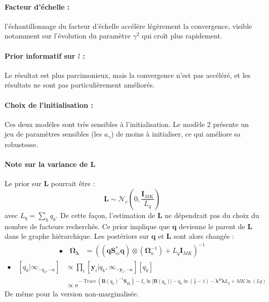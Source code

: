 \documentclass[ 12pt]{article}
\newcommand{\e}{\mathrm{e}}
\newcommand{\tr}[1]{\operatorname{Trace}\!\left(#1\right)}
\begin{document}
\paragraph{Facteur d'échelle : } l'échantillonnage du facteur d'échelle accélère légèrement la convergence, visible notamment sur l'évolution du paramètre $\gamma^2$ qui croît plus rapidement.

\paragraph{Prior informatif sur $l$ :} Le résultat est plus parcimonieux, mais la convergence n'est pas accéléré, et les résultats ne sont pas particulièrement améliorés.

\paragraph{Choix de l'initialisation : } Ces deux modèles sont très sensibles à l'initialisation.  Le modèle 2 présente un jeu de paramètres sensibles (les $a_\gamma$) de moins à initialiser, ce qui améliore sa robustesse.

\paragraph{Note sur la variance de $\bm{L}$}
Le prior sur $\bm{L}$ pourrait être : 
\begin{equation*}
	    \bm{L} \sim \mathcal{N}_c (0,\frac{\bm{I}_{MK}}{L_q})
\end{equation*}
avec $L_q=\sum_k q_k$.
De cette façon, l'estimation de $\bm{L}$ ne dépendrait pas du choix du nombre de facteurs recherchés. Ce prior implique que $\bm{q}$ devienne le parent de $\bm{L}$ dans le graphe hiérarchique. 
Les postériors sur $\bm{q}$ et $\bm{L}$ sont alors changés : 
\begin{align*}
	\bullet \quad   \bm{\Omega_\lambda} &=\left( (\bm{q}\bm{S}_{cc}^* \bm{q}) \otimes (\bm{\Omega}_n^{-1}) + L_q \bm{I}_{MK}   \right)^{-1}
\end{align*}
\begin{align*}
	\bullet \quad  \left[q_k | \infty	_{-q_k,-\bm{c}}  \right] &\propto \prod_i  \left[ \bm{y}_i |q_k, \infty_{-\bm{y}_i,-\bm{c}} \right] [q_k]\\
	& \propto \e^{-\tr{ \bm{B}(q_k)^{-1}\bm{S}_{yy}} - I_s\ln|\bm{B}(q_k)| - q_k \ln\left( \frac{1}{l}-1 \right) - \bm{\lambda}^H\bm{\lambda}L_q + MK \ln(Lq)}
\end{align*}
De même pour la version non-marginalisée.
\end{document}
